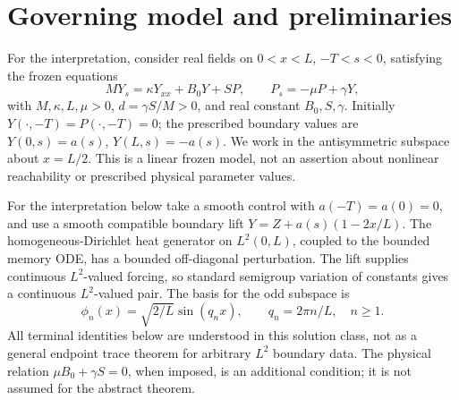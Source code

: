 \section{Governing model and preliminaries}\label{sec:model}
For the interpretation, consider real fields on \(0<x<L\), \(-T<s<0\), satisfying the frozen equations
\begin{equation}\label{eq:pde}
M Y_s=\kappa Y_{xx}+B_0Y+SP,\qquad P_s=-\mu P+\gamma Y,
\end{equation}
with \(M,\kappa,L,\mu>0\), \(d=\gamma S/M>0\), and real constant \(B_0,S,\gamma\). Initially \(Y(\cdot,-T)=P(\cdot,-T)=0\); the prescribed boundary values are \(Y(0,s)=a(s)\), \(Y(L,s)=-a(s)\). We work in the antisymmetric subspace about \(x=L/2\). This is a linear frozen model, not an assertion about nonlinear reachability or prescribed physical parameter values.

For the interpretation below take a smooth control with \(a(-T)=a(0)=0\), and use a smooth compatible boundary lift \(Y=Z+a(s)(1-2x/L)\). The homogeneous-Dirichlet heat generator on \(L^2(0,L)\), coupled to the bounded memory ODE, has a bounded off-diagonal perturbation. The lift supplies continuous \(L^2\)-valued forcing, so standard semigroup variation of constants gives a continuous \(L^2\)-valued pair. The basis for the odd subspace is
\begin{equation}\label{eq:basis}
\phi_n(x)=\sqrt{2/L}\sin(q_nx),\qquad q_n=2\pi n/L,\quad n\ge1.
\end{equation}
All terminal identities below are understood in this solution class, not as a general endpoint trace theorem for arbitrary \(L^2\) boundary data. The physical relation \(\mu B_0+\gamma S=0\), when imposed, is an additional condition; it is not assumed for the abstract theorem.
